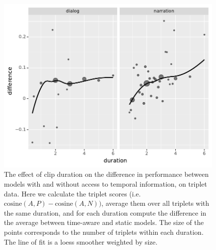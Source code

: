 \begin{figure}[htb]
  \centering
  \includegraphics[width=\columnwidth]{results/duration_effect.pdf}
  \caption{The effect of clip duration on the difference in
    performance between models with and without access to temporal
    information, on triplet data. Here we calculate the 
    triplet scores (i.e.\ $\mathrm{cosine}(A, P) - \mathrm{cosine}(A,
    N))$, average them over all triplets with the same duration, and
    for each duration compute the difference in the average between
    time-aware and static models. The size of the points corresponds
    to the number of triplets within each duration. The line of fit is
    a {\sc loess} smoother weighted by size.}
  \label{fig:duration_effect}
\end{figure}

